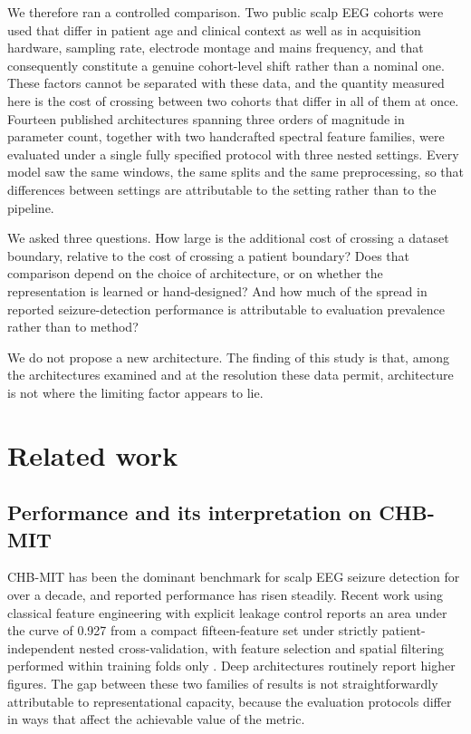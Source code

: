 \documentclass[11pt,a4paper]{article}
\begin{document}
We therefore ran a controlled comparison. Two public scalp EEG cohorts were
used that differ in patient age and clinical context as well as in
acquisition hardware, sampling rate, electrode montage and mains frequency,
and that consequently constitute a genuine cohort-level shift rather than a
nominal one. These factors cannot be separated with these data, and the
quantity measured here is the cost of crossing between two cohorts that
differ in all of them at once. Fourteen published
architectures spanning three orders of magnitude in parameter count, together
with two handcrafted spectral feature families, were evaluated under a single
fully specified protocol with three nested settings. Every model saw the same
windows, the same splits and the same preprocessing, so that differences
between settings are attributable to the setting rather than to the pipeline.

We asked three questions. How large is the additional cost of crossing a
dataset boundary, relative to the cost of crossing a patient boundary? Does
that comparison depend on the choice of architecture, or on whether the
representation is learned or hand-designed? And how much of the spread in
reported seizure-detection performance is attributable to evaluation
prevalence rather than to method?

We do not propose a new architecture. The finding of this study is that,
among the architectures examined and at the resolution these data permit,
architecture is not where the limiting factor appears to lie.

\section{Related work}

\subsection{Performance and its interpretation on CHB-MIT}

CHB-MIT \citep{shoeb2009} has been the dominant benchmark for scalp EEG
seizure detection for over a decade, and reported performance has risen
steadily. Recent work using classical feature engineering with explicit
leakage control reports an area under the curve of 0.927 from a compact
fifteen-feature set under strictly patient-independent nested
cross-validation, with feature selection and spatial filtering performed
within training folds only \citep{discoverappl2026}. Deep architectures
routinely report higher figures. The gap between these two families of
results is not straightforwardly attributable to representational capacity,
because the evaluation protocols differ in ways that affect the achievable
value of the metric.
\end{document}
